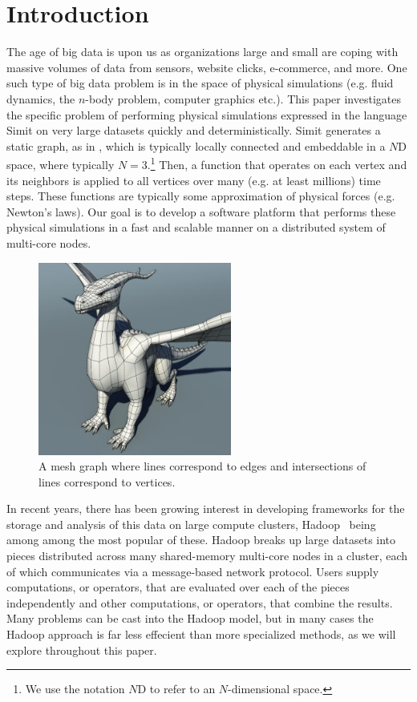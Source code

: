 \section{Introduction}
\label{sec:intro}

The age of {\large big data} is upon us as organizations large and small 
are coping with massive volumes of data from sensors, website 
clicks, e-commerce, and more. One such type of big data
problem is in the space of physical simulations (e.g. fluid dynamics,
the $n$-body problem, computer graphics etc.).  This paper investigates 
the specific problem of performing physical simulations
expressed in the language Simit on very large datasets quickly and
deterministically.  Simit generates a static graph, as in , 
which is typically
locally connected and embeddable in a $N$D space, where typically
$N=3$.\footnote{We use the notation $N$D to refer to an $N$-dimensional
space.}  Then, a function that operates on each vertex and its neighbors 
is applied to all vertices over many (e.g. at least millions) time steps.
These functions are typically some approximation of physical forces (e.g.
Newton's laws).  Our goal is to develop a software platform that performs these
physical simulations in a fast and scalable manner on a distributed system of 
multi-core nodes.

\begin{figure}[h]
\centering
\includegraphics[width=2.5in]{dragon}
\caption{A mesh graph where lines correspond to edges and intersections of lines correspond to vertices.}
\label{fig:mesh}
\end{figure}


In recent years, there has been 
growing interest in developing frameworks for the storage and 
analysis of this data on large compute clusters, 
Hadoop~\cite{CuttingCa05,DeanGh08} being among among the most 
popular of these. Hadoop breaks up 
large datasets into pieces distributed across many shared-memory
multi-core nodes in a cluster, each of which communicates via
a message-based network protocol. Users supply computations, 
or  operators, that are evaluated over each of 
the pieces independently and other computations, or  
operators, that combine the results. 
Many problems can be cast into the Hadoop model, but in many 
cases the Hadoop approach is far less effecient than more 
specialized methods, as we will explore throughout this paper.

